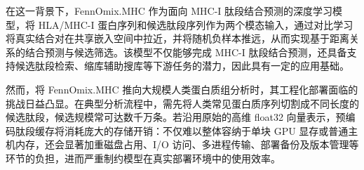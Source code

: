 在这一背景下，FennOmix.MHC 作为面向 MHC-I 肽段结合预测的深度学习模型，将 HLA/MHC-I 蛋白序列和候选肽段序列作为两个模态输入，通过对比学习将真实结合对在共享嵌入空间中拉近，并将随机负样本推远，从而实现基于距离关系的结合预测与候选筛选。该模型不仅能够完成 MHC-I 肽段结合预测，还具备支持候选肽段检索、缩库辅助搜库等下游任务的潜力，因此具有一定的应用基础。


然而，将 FennOmix.MHC 推向大规模人类蛋白质组分析时，其工程化部署面临的挑战日益凸显。在典型分析流程中，需先将人类常见蛋白质序列切割成不同长度的候选肽段，候选规模常可达数千万条。若沿用原始的高维 float32 向量表示，预编码肽段缓存将消耗庞大的存储开销：不仅难以整体容纳于单块 GPU 显存或普通主机内存，还会显著加重磁盘占用、I/O 访问、多进程传输、部署备份及版本管理等环节的负担，进而严重制约模型在真实部署环境中的使用效率。





